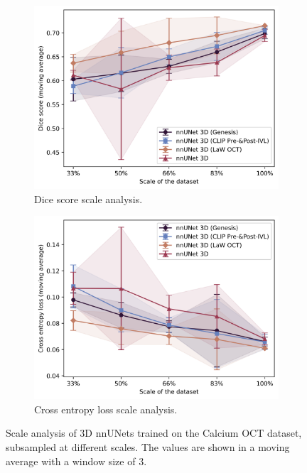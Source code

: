 \documentclass[a4paper,11pt,oneside]{report}
\begin{document}
\begin{figure}[hbt]
    \centering
    \begin{subfigure}[t]{0.49\textwidth}
        \includegraphics[width=1\linewidth]{figures/discussion_scale_analysis.png}
        \caption{Dice score scale analysis.}
        \label{fig:scale-analysis}
    \end{subfigure}%
    \begin{subfigure}[t]{0.49\textwidth}
        \includegraphics[width=1\linewidth]{figures/discussion_cross_entropy_scale_analysis.png}
        \caption{Cross entropy loss scale analysis.}
        \label{fig:cross-entropy-scale-analysis}
    \end{subfigure}
    \caption{Scale analysis of 3D nnUNets trained on the Calcium OCT dataset, subsampled at different scales. The values are shown in a moving average with a window size of 3.}
\end{figure}
\end{document}
